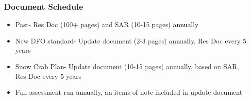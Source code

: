 

\begin{frame}

\frametitle{Document Schedule}

 \vspace*{-0.5cm}
\begin{block}

\begin{itemize}
\item Past- Res Doc (100+ pages) and SAR (10-15 pages) annually
\item New DFO standard- Update document (2-3 pages) annually, Res Doc every 5 years
\item Snow Crab Plan- Update document (10-15 pages) annually, based on SAR, Res Doc every 5 years
\item Full assessment run annually, an items of note included in update document

\end{itemize}



\end{block}


\end{frame}


 


